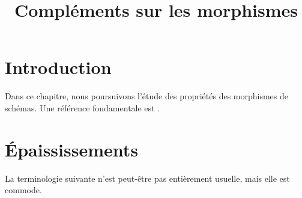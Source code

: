 

%

\setlength{\emergencystretch}{4em}
\title{Compléments sur les morphismes}


\maketitle

\label{section-phantom}

\tableofcontents

\section{Introduction}
\label{section-introduction}

\noindent
Dans ce chapitre, nous poursuivons l'étude des propriétés des morphismes de schémas.
Une référence fondamentale est \cite{EGA}.






\section{Épaississements}
\label{section-thickenings}

\noindent
La terminologie suivante n'est peut-être pas entièrement usuelle, mais elle est commode.

